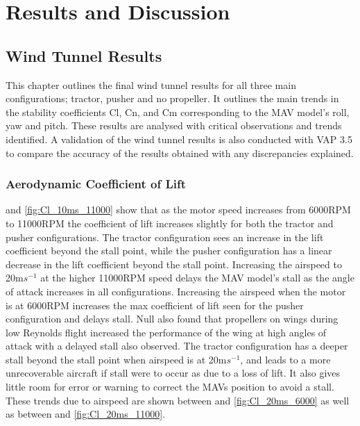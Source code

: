 \graphicspath{{./Figs/}}

\chapter{Results and Discussion} 

\section{Wind Tunnel Results}
This chapter outlines the final wind tunnel results for all three main configurations; tractor, pusher and no propeller. It outlines the main trends in the stability coefficients Cl, Cn, and Cm corresponding to the \acrshort{MAV} model's roll, yaw and pitch. These results are analysed with critical observations and trends identified. A validation of the wind tunnel results is also conducted with VAP 3.5 to compare the accuracy of the results obtained with any discrepancies explained.



\subsection{Aerodynamic Coefficient of Lift}
 and \ref{fig:Cl_10ms_11000} show that as the motor speed increases from 6000RPM to 11000RPM the coefficient of lift increases slightly for both the tractor and pusher configurations. The tractor configuration sees an increase in the lift coefficient beyond the stall point, while the pusher configuration has a linear decrease in the lift coefficient beyond the stall point. Increasing the airspeed to 20m$s^{-1}$ at the higher 11000RPM speed delays the \acrshort{MAV} model's stall as the angle of attack increases in all configurations. Increasing the airspeed when the motor is at 6000RPM increases the max coefficient of lift seen for the pusher configuration and delays stall. Null also found that propellers on wings during low Reynolds flight increased the performance of the wing at high angles of attack \cite{Null2005} with a delayed stall also observed. The tractor configuration has a deeper stall beyond the stall point when airspeed is at 20m$s^{-1}$, and leads to a more unrecoverable aircraft if stall were to occur as due to a loss of lift. It also gives little room for error or warning to correct the \acrshort{MAV}s position to avoid a stall. These trends due to airspeed are shown between  and \ref{fig:Cl_20ms_6000} as well as between  and \ref{fig:Cl_20ms_11000}.

